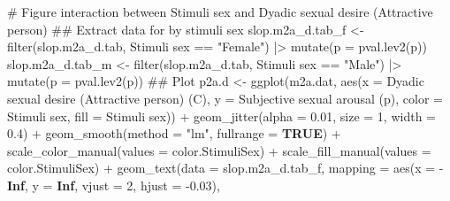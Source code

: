 \documentclass[
  bookmarksnumbered]{article}
\newenvironment{Shaded}{\begin{snugshade}}{\end{snugshade}}
\newcommand{\AttributeTok}[1]{\textcolor[rgb]{0.80,0.80,0.80}{#1}}
\newcommand{\CommentTok}[1]{\textcolor[rgb]{0.50,0.62,0.50}{#1}}
\newcommand{\ConstantTok}[1]{\textcolor[rgb]{0.86,0.64,0.64}{\textbf{#1}}}
\newcommand{\DecValTok}[1]{\textcolor[rgb]{0.86,0.86,0.80}{#1}}
\newcommand{\DocumentationTok}[1]{\textcolor[rgb]{0.50,0.62,0.50}{#1}}
\newcommand{\FloatTok}[1]{\textcolor[rgb]{0.75,0.75,0.82}{#1}}
\newcommand{\FunctionTok}[1]{\textcolor[rgb]{0.94,0.94,0.56}{#1}}
\newcommand{\NormalTok}[1]{\textcolor[rgb]{0.80,0.80,0.80}{#1}}
\newcommand{\OtherTok}[1]{\textcolor[rgb]{0.94,0.94,0.56}{#1}}
\newcommand{\SpecialCharTok}[1]{\textcolor[rgb]{0.86,0.64,0.64}{#1}}
\newcommand{\StringTok}[1]{\textcolor[rgb]{0.80,0.58,0.58}{#1}}
\begin{document}
\begin{Shaded}
\begin{Highlighting}[]
\CommentTok{\# Figure interaction between Stimuli sex and Dyadic sexual desire (Attractive person)}
\DocumentationTok{\#\# Extract data for by stimuli sex}
\NormalTok{slop.m2a\_d.tab\_f }\OtherTok{\textless{}{-}} \FunctionTok{filter}\NormalTok{(slop.m2a\_d.tab, }\StringTok{\textasciigrave{}}\AttributeTok{Stimuli sex}\StringTok{\textasciigrave{}} \SpecialCharTok{==} \StringTok{"Female"}\NormalTok{) }\SpecialCharTok{|\textgreater{}}
  \FunctionTok{mutate}\NormalTok{(}\AttributeTok{p =} \FunctionTok{pval.lev2}\NormalTok{(p))}
\NormalTok{slop.m2a\_d.tab\_m }\OtherTok{\textless{}{-}} \FunctionTok{filter}\NormalTok{(slop.m2a\_d.tab, }\StringTok{\textasciigrave{}}\AttributeTok{Stimuli sex}\StringTok{\textasciigrave{}} \SpecialCharTok{==} \StringTok{"Male"}\NormalTok{) }\SpecialCharTok{|\textgreater{}}
  \FunctionTok{mutate}\NormalTok{(}\AttributeTok{p =} \FunctionTok{pval.lev2}\NormalTok{(p))}
\DocumentationTok{\#\# Plot}
\NormalTok{p2a.d }\OtherTok{\textless{}{-}} \FunctionTok{ggplot}\NormalTok{(m2a.dat, }\FunctionTok{aes}\NormalTok{(}\AttributeTok{x =} \StringTok{\textasciigrave{}}\AttributeTok{Dyadic sexual desire (Attractive person) (C)}\StringTok{\textasciigrave{}}\NormalTok{,}
                             \AttributeTok{y =} \StringTok{\textasciigrave{}}\AttributeTok{Subjective sexual arousal (p)}\StringTok{\textasciigrave{}}\NormalTok{,}
                             \AttributeTok{color =} \StringTok{\textasciigrave{}}\AttributeTok{Stimuli sex}\StringTok{\textasciigrave{}}\NormalTok{, }\AttributeTok{fill =} \StringTok{\textasciigrave{}}\AttributeTok{Stimuli sex}\StringTok{\textasciigrave{}}\NormalTok{)) }\SpecialCharTok{+}
  \FunctionTok{geom\_jitter}\NormalTok{(}\AttributeTok{alpha =} \FloatTok{0.01}\NormalTok{, }\AttributeTok{size =} \DecValTok{1}\NormalTok{, }\AttributeTok{width =} \FloatTok{0.4}\NormalTok{) }\SpecialCharTok{+}
  \FunctionTok{geom\_smooth}\NormalTok{(}\AttributeTok{method =} \StringTok{"lm"}\NormalTok{, }\AttributeTok{fullrange =} \ConstantTok{TRUE}\NormalTok{) }\SpecialCharTok{+}
  \FunctionTok{scale\_color\_manual}\NormalTok{(}\AttributeTok{values =}\NormalTok{ color.StimuliSex) }\SpecialCharTok{+}
  \FunctionTok{scale\_fill\_manual}\NormalTok{(}\AttributeTok{values =}\NormalTok{ color.StimuliSex) }\SpecialCharTok{+}
  \FunctionTok{geom\_text}\NormalTok{(}\AttributeTok{data =}\NormalTok{ slop.m2a\_d.tab\_f,}
            \AttributeTok{mapping =} \FunctionTok{aes}\NormalTok{(}\AttributeTok{x =} \SpecialCharTok{{-}}\ConstantTok{Inf}\NormalTok{, }\AttributeTok{y =} \ConstantTok{Inf}\NormalTok{,}
            \AttributeTok{vjust =} \DecValTok{2}\NormalTok{, }\AttributeTok{hjust =} \SpecialCharTok{{-}}\FloatTok{0.03}\NormalTok{),}

\end{Highlighting}
\end{Shaded}
\end{document}
